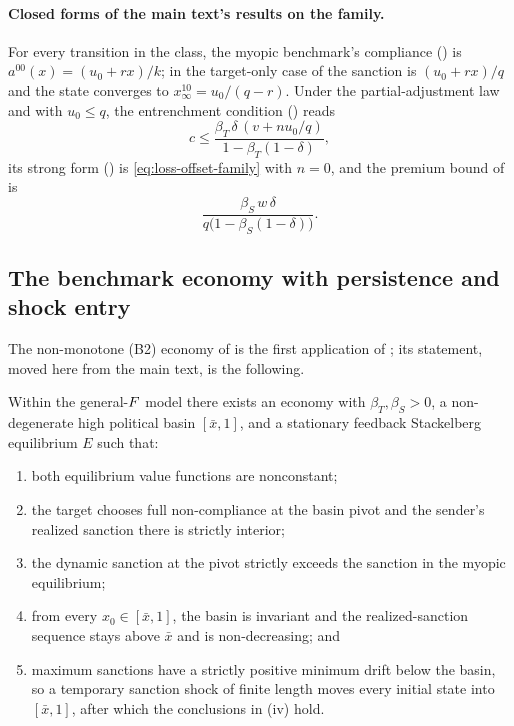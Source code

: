 \paragraph{Closed forms of the main text's results on the family.} For every
transition in the class, the myopic benchmark's compliance
() is $a^{00}(x)=(u_0+rx)/k$; in the target-only case of
 the sanction is $(u_0+rx)/q$ and the state converges to
$x^{10}_\infty=u_0/(q-r)$. Under the partial-adjustment law and with $u_0\le q$, the
entrenchment condition () reads
\begin{equation}
c\le\frac{\beta_T\,\delta\,(v+nu_0/q)}{1-\beta_T(1-\delta)} ,
\label{eq:loss-offset-family}
\end{equation}
its strong form () is \eqref{eq:loss-offset-family} with
$n=0$, and the premium bound of  is
\begin{equation}
\frac{\beta_S\,w\,\delta}{q\bigl(1-\beta_S(1-\delta)\bigr)} .
\label{eq:sender-wedge-family}
\end{equation}

\subsection{The benchmark economy with persistence and shock entry}
\label{app:witness:benchmark}

The non-monotone (B2) economy of  is the first
application of ; its statement, moved here from
the main text, is the following.

\begin{theorem}
\label{thm:b2-benchmark}
Within the general-$F$ model there exists an economy with
$\beta_T,\beta_S>0$, a non-degenerate high political basin
$[\bar x,1]$, and a stationary feedback Stackelberg equilibrium $E$ such that:
\begin{enumerate}[label=(\roman*)]
\item both equilibrium value functions are nonconstant;
\item the target chooses full non-compliance at the basin pivot and the
sender's realized sanction there is strictly interior;
\item the dynamic sanction at the pivot strictly exceeds the sanction
in the myopic equilibrium;
\item from every $x_0\in[\bar x,1]$, the basin is invariant and the
realized-sanction sequence stays above $\bar x$ and is non-decreasing;
and
\item maximum sanctions have a strictly positive minimum drift below
the basin, so a temporary sanction shock of finite length moves every initial
state into $[\bar x,1]$, after which the conclusions in (iv) hold.
\end{enumerate}
\end{theorem}

